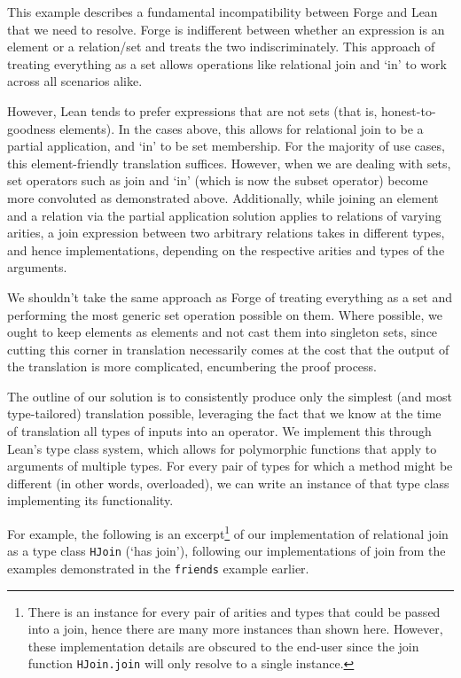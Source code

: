 This example describes a fundamental incompatibility between Forge and Lean that we need to resolve. Forge is indifferent between whether an expression is an element or a relation/set and treats the two indiscriminately. This approach of treating everything as a set allows operations like relational join and `in' to work across all scenarios alike. 

However, Lean tends to prefer expressions that are not sets (that is, honest-to-goodness elements). In the cases above, this allows for relational join to be a partial application, and `in' to be set membership. For the majority of use cases, this element-friendly translation suffices. However, when we are dealing with sets, set operators such as join and `in' (which is now the subset operator) become more convoluted as demonstrated above. Additionally, while joining an element and a relation via the partial application solution applies to relations of varying arities, a join expression between two arbitrary relations takes in different types, and hence implementations, depending on the respective arities and types of the arguments. 

We shouldn't take the same approach as Forge of treating everything as a set and performing the most generic set operation possible on them. Where possible, we ought to keep elements as elements and not cast them into singleton sets, since cutting this corner in translation necessarily comes at the cost that the output of the translation is more complicated, encumbering the proof process. 

The outline of our solution is to consistently produce only the simplest (and most type-tailored) translation possible, leveraging the fact that we know at the time of translation all types of inputs into an operator. We implement this through Lean's type class system, which allows for polymorphic functions that apply to arguments of multiple types. For every pair of types for which a method might be different (in other words, overloaded), we can write an instance of that type class implementing its functionality. 

For example, the following is an excerpt\footnote{There is an instance for every pair of arities and types that could be passed into a join, hence there are many more instances than shown here. However, these implementation details are obscured to the end-user since the join function \texttt{HJoin.join} will only resolve to a single instance.} of our implementation of relational join as a type class \texttt{HJoin} (`has join'), following our implementations of join from the examples demonstrated in the \texttt{friends} example earlier. 

